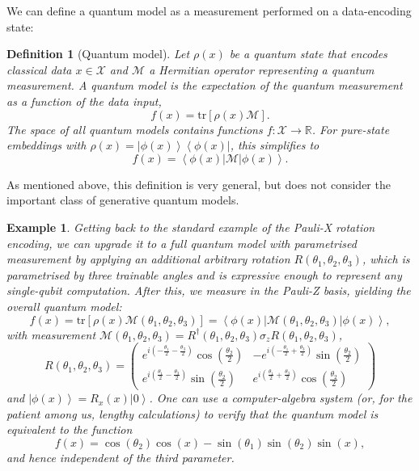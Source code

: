 \documentclass[aps, reprint, onecolumn, nofootinbib, longbibliography]{revtex4-2}
\newtheorem{definition}{Definition}[]
\newcommand{\ket}[1]{\ensuremath{\left| #1 \right \rangle}}
\newcommand{\bra}[1]{\ensuremath{\left \langle #1 \right |}}
\newcommand{\ketbra}[2]{\ket{#1}\!\bra{#2}}
\newcommand{\tr}[1]{ \mathrm{tr}\left[#1\right] }
\newcommand{\meas}{\mathcal{M}}
\newtheorem{example}{Example}[section]
\begin{document}
We can define a quantum model as a measurement performed on a data-encoding state:
\begin{definition}[Quantum model]
    Let $\rho(x)$ be a quantum state that encodes classical data $x \in \mathcal{X}$ and $\meas$ a Hermitian operator representing a quantum measurement.
    A quantum model is the expectation of the quantum measurement as a function of the data input,
    \begin{equation}\label{eq:quantum_model}
        f(x) = \tr{ \rho(x) \meas }.
    \end{equation}
    The space of all quantum models contains functions $f: \mathcal{X} \rightarrow \mathbb{R}$.
    For pure-state embeddings with $\rho(x)= \ketbra{\phi(x)}{\phi(x)}$, this simplifies to
    \begin{equation}
    f(x) = \bra{\phi(x)} \meas \ket{\phi(x)}.
    \end{equation}
\end{definition}
As mentioned above, this definition is very general, but does not consider the important class of generative quantum models.

\begin{example}
   Getting back to the standard example of the Pauli-X rotation encoding, we can upgrade it to a full quantum model with parametrised measurement by applying an additional arbitrary rotation $R(\theta_1, \theta_2, \theta_3)$, which is parametrised by three trainable angles and is expressive enough to represent any single-qubit computation. After this, we measure in the Pauli-Z basis, yielding the overall quantum model:
   \begin{equation}
       f(x) = \tr{ \rho(x)  \meas(\theta_1, \theta_2, \theta_3)}=  \bra{\phi(x)} \meas(\theta_1, \theta_2, \theta_3)\ket{\phi(x)},
   \end{equation}
   with measurement $\meas(\theta_1, \theta_2, \theta_3) = R^{\dagger}(\theta_1, \theta_2, \theta_3) \sigma_z  R(\theta_1, \theta_2, \theta_3)$,
\begin{equation}
 	R(\theta_1, \theta_2, \theta_3) = \begin{pmatrix}
    e^{i(-\frac{\theta_1}{2}-\frac{\theta_3}{2})}\cos(\frac{\theta_2}{2}) & -e^{i(-\frac{\theta_1}{2}+\frac{\theta_3}{2})}\sin(\frac{\theta_2}{2})\\
    e^{i(\frac{\theta_1}{2}-\frac{\theta_3}{2})}\sin(\frac{\theta_2}{2}) &
    e^{i(\frac{\theta_1}{2}+\frac{\theta_3}{2})}\cos(\frac{\theta_2}{2})
    \end{pmatrix}
\end{equation}   
    and $\ket{\phi(x)} =  R_x(x) \ket{0}$.  One can use a computer-algebra system (or, for the patient among us, lengthy calculations) to verify that the quantum model is equivalent to the function
   \begin{equation}\label{eq:example_model}
   f(x) =  \cos (\theta_2) \cos (x) - \sin(\theta_1) \sin (\theta_2) \sin (x),
   \end{equation}
   and hence independent of the third parameter. 
\end{example}
\end{document}
